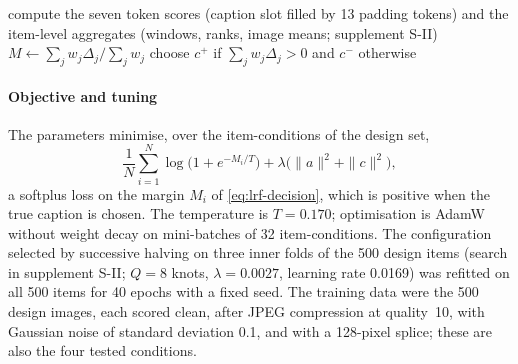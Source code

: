 \begin{algorithm}[!t]
\footnotesize
\caption{Decision rule of the frozen LRF}\label{alg:lrf}
compute the seven token scores (caption slot filled by 13 padding tokens) and the item-level aggregates (windows, ranks, image means; supplement S-II)\;
$M\leftarrow\sum_jw_j\Delta_j\big/\sum_jw_j$\;
choose $c^+$ if $\sum_jw_j\Delta_j>0$ and $c^-$ otherwise\;
\end{algorithm}

\paragraph*{Objective and tuning}
The parameters minimise, over the item-conditions of the design set,
\begin{equation}
\frac1N\sum_{i=1}^{N}\log\big(1+e^{-M_i/T}\big)+\lambda\big(\|a\|^2+\|c\|^2\big),
\label{eq:lrf-objective}
\end{equation}
a softplus loss on the margin $M_i$ of \cref{eq:lrf-decision}, which is positive when the true caption is chosen.
The temperature is $T=0.170$; optimisation is AdamW without weight decay on mini-batches of 32 item-conditions.
The configuration selected by successive halving on three inner folds of the 500 design items (search in supplement S-II; $Q=8$ knots,
$\lambda=0.0027$, learning rate 0.0169) was refitted on all 500 items for 40 epochs with a fixed seed.
The training data were the 500 design images, each scored clean, after JPEG compression at quality~10, with Gaussian noise of standard
deviation 0.1, and with a 128-pixel splice; these are also the four tested conditions.

